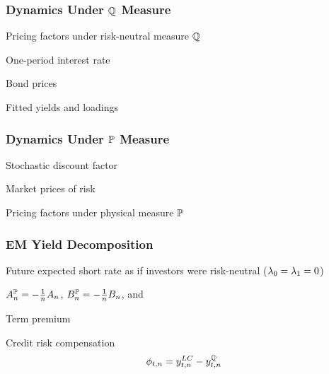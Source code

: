 \documentclass[12pt, aspectratio=169, xcolor=dvipsnames]{beamer}
\begin{document}
\begin{frame}[label=Qdynamics]
\frametitle{Dynamics Under \(\mathbb{Q}\) Measure}

Pricing factors under risk-neutral measure \(\mathbb{Q}\)


One-period interest rate


Bond prices %


Fitted yields and loadings


\end{frame}

\begin{frame}[label=Pdynamics]
\frametitle{Dynamics Under \(\mathbb{P}\) Measure}

Stochastic discount factor


Market prices of risk


Pricing factors under physical measure \(\mathbb{P}\)


\end{frame}

\begin{frame}[label=Components]
\frametitle{EM Yield Decomposition}

Future expected short rate as if investors were risk-neutral (\(\lambda_{0} = \lambda_{1} = 0\))

\begin{center}
	\(A_{n}^{\mathbb{P}} = - \frac{1}{n} A_{n}\), \(B_{n}^{\mathbb{P}} = - \frac{1}{n} B_{n}\),  and 
\end{center}


Term premium


Credit risk compensation
\[\phi_{t,n} = y_{t,n} ^{LC} - y_{t,n}^{\mathbb{Q}}\]

\end{frame}
\end{document}
